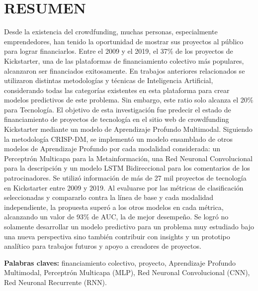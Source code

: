 
\chapter*{RESUMEN}

Desde la existencia del crowdfunding, muchas personas, especialmente emprendedores, han tenido la oportunidad de mostrar sus proyectos al público para lograr financiarlos. Entre el 2009 y el 2019, el 37\% de los proyectos de Kickstarter, una de las plataformas de financiamiento colectivo más populares, alcanzaron ser financiados exitosamente. En trabajos anteriores relacionados se utilizaron distintas metodologías y técnicas de Inteligencia Artificial, considerando todas las categorías existentes en esta plataforma para crear modelos predictivos de este problema. Sin embargo, este ratio solo alcanza el 20\% para Tecnología. El objetivo de esta investigación fue predecir el estado de financiamiento de proyectos de tecnología en el sitio web de crowdfunding Kickstarter mediante un modelo de Aprendizaje Profundo Multimodal. Siguiendo la metodología CRISP-DM, se implementó un modelo ensamblado de otros modelos de Aprendizaje Profundo por cada modalidad considerada: un Perceptrón Multicapa para la Metainformación, una Red Neuronal Convolucional para la descripción y un modelo LSTM Bidireccional para los comentarios de los patrocinadores. Se utilizó información de más de 27 mil proyectos de tecnología en Kickstarter entre 2009 y 2019. Al evaluarse por las métricas de clasificación seleccionadas y compararlo contra la línea de base y cada modalidad independiente, la propuesta superó a los otros modelos en cada métrica, alcanzando un valor de 93\% de AUC, la de mejor desempeño. Se logró no solamente desarrollar un modelo predictivo para un problema muy estudiado bajo una nueva perspectiva sino también contribuir con insights y un prototipo analítico para trabajos futuros y apoyo a creadores de proyectos.

\textbf{Palabras claves: } financiamiento colectivo, proyecto, Aprendizaje Profundo Multimodal, Perceptrón Multicapa (MLP), Red Neuronal Convolucional (CNN), Red Neuronal Recurrente (RNN).

\clearpage
